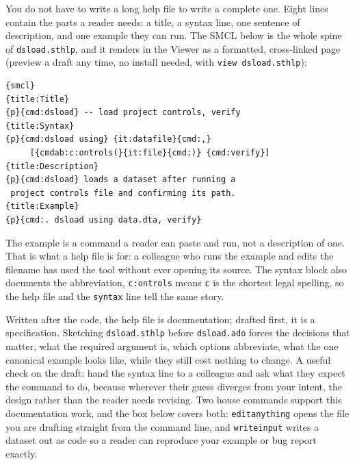 You do not have to write a long help file to write a complete one. Eight lines contain the parts a reader needs: a title, a syntax line, one sentence of description, and one example they can run. The SMCL below is the whole spine of \texttt{dsload.sthlp}, and it renders in the Viewer as a formatted, cross-linked page (preview a draft any time, no install needed, with \texttt{view dsload.sthlp}):
\par
{\footnotesize
\begin{verbatim}
{smcl}
{title:Title}
{p}{cmd:dsload} -- load project controls, verify
{title:Syntax}
{p}{cmd:dsload using} {it:datafile}{cmd:,}
     [{cmdab:c:ontrols(}{it:file}{cmd:)} {cmd:verify}]
{title:Description}
{p}{cmd:dsload} loads a dataset after running a
 project controls file and confirming its path.
{title:Example}
{p}{cmd:. dsload using data.dta, verify}
\end{verbatim}
}
The example is a command a reader can paste and run, not a description of one. That is what a help file is for: a colleague who runs the example and edits the filename has used the tool without ever opening its source. The syntax block also documents the abbreviation, \texttt{c:ontrols} means \texttt{c} is the shortest legal spelling, so the help file and the \texttt{syntax} line tell the same story.

Written after the code, the help file is documentation; drafted first, it is a specification. Sketching \texttt{dsload.sthlp} before \texttt{dsload.ado} forces the decisions that matter, what the required argument is, which options abbreviate, what the one canonical example looks like, while they still cost nothing to change. A useful check on the draft: hand the syntax line to a colleague and ask what they expect the command to do, because wherever their guess diverges from your intent, the design rather than the reader needs revising. Two house commands support this documentation work, and the box below covers both: \texttt{editanything} opens the file you are drafting straight from the command line, and \texttt{writeinput} writes a dataset out as code so a reader can reproduce your example or bug report exactly.

